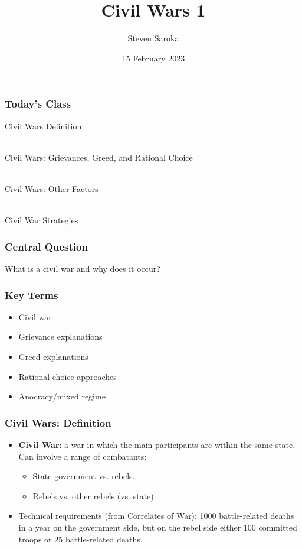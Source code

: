\documentclass{beamer}
\title[Civil Wars 1]{\LARGE{Civil Wars 1}}
\author[POLI 150]{Steven Saroka}
\institute{POLI 150}
\date{15 February 2023}
\begin{document}
\begin{frame}
\titlepage %
\end{frame}





	\begin{frame} 
	\frametitle{\LARGE{Today's Class}}
	\begin{itemize}
		\Large{
			\item Civil Wars Definition
			\\~\\ 
			\item Civil Wars: Grievances, Greed, and Rational Choice
			\\~\\
			\item Civil Wars: Other Factors
			\\~\\
			\item Civil War Strategies
		}
	\end{itemize}
\end{frame}

\begin{frame} 
	\frametitle{\LARGE{Central Question}}
    \centering
    \Large{What is a civil war and why does it occur?} 
\end{frame}

\begin{frame} 
	\frametitle{\LARGE{Key Terms}}
	\begin{itemize}
		\item Civil war
		\item Grievance explanations
		\item Greed explanations
		\item Rational choice approaches
		\item Anocracy/mixed regime
	\end{itemize}
\end{frame}

\begin{frame} 
\frametitle{\LARGE{Civil Wars: Definition}}
\begin{itemize}
		\item \textbf{Civil War}: a war in which the main participants are within the same state. Can involve a range of combatants: \pause
		\begin{itemize}
		    \item State government vs. rebels. \pause
		    \item Rebels vs. other rebels (vs. state). \pause
		\end{itemize}
		\item Technical requirements (from Correlates of War): 1000 battle-related deaths in a year on the government side, but on the rebel side either 100 committed troops or 25 battle-related deaths.
\end{itemize}
\end{frame}
\end{document}
